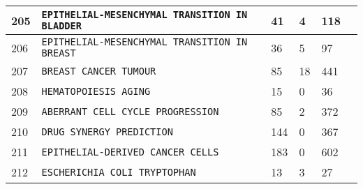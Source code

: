 \documentclass{article}
\begin{document}
\begin{center}
\begin{tabular}{ | C{16pt} | C{149pt} | C{25pt} | C{25pt} | C{25pt} | C{36pt} | }
		 & \texttt{EPITHELIAL-MESENCHYMAL TRANSITION IN BLADDER} & 41 & 4 & 118 & \cite{bbm-205-206} \\
		 & \texttt{EPITHELIAL-MESENCHYMAL TRANSITION IN BREAST} & 36 & 5 & 97 & \cite{bbm-205-206} \\
		 & \texttt{BREAST CANCER TUMOUR} & 85 & 18 & 441 & \cite{bbm-207} \\
		 & \texttt{HEMATOPOIESIS AGING} & 15 & 0 & 36 & \cite{bbm-208} \\
		 & \texttt{ABERRANT CELL CYCLE PROGRESSION} & 85 & 2 & 372 & \cite{bbm-209} \\
		 & \texttt{DRUG SYNERGY PREDICTION} & 144 & 0 & 367 & \cite{bbm-210} \\
		 & \texttt{EPITHELIAL-DERIVED CANCER CELLS} & 183 & 0 & 602 & \cite{bbm-211} \\
		 & \texttt{ESCHERICHIA COLI TRYPTOPHAN} & 13 & 3 & 27 & \cite{bbm-212} \\
		\hline
	\end{tabular}

\end{center}



\end{document}
